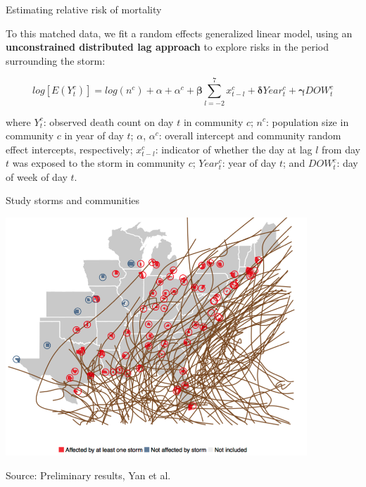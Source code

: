 \documentclass[ignorenonframetext,]{beamer}
\begin{document}
\begin{frame}{Estimating relative risk of mortality}

To this matched data, we fit a random effects generalized linear model,
using an \textbf{unconstrained distributed lag approach} to explore
risks in the period surrounding the storm:

\begin{equation*}
log[E(Y_t^c)]=log(n^c) + \alpha + \alpha^c + 
\boldsymbol{\beta}\sum_{l=-2}^{7} x_{t-l}^c + \boldsymbol{\delta} Year_t^c + 
\boldsymbol{\gamma} DOW_t^c
\end{equation*}

\small

where \(Y_t^c\): observed death count on day \(t\) in community \(c\);
\(n^c\): population size in community \(c\) in year of day \(t\);
\(\alpha\), \(\alpha^c\): overall intercept and community random effect
intercepts, respectively; \(x_{t-l}^c\): indicator of whether the day at
lag \(l\) from day \(t\) was exposed to the storm in community \(c\);
\(Year_t^c\): year of day \(t\); and \(DOW_t^c\): day of week of day
\(t\).

\end{frame}

\begin{frame}{Study storms and communities}

\begin{center}\includegraphics[width=0.85\textwidth]{figures/mortality_storms_counties} \end{center}

\footnotesize Source: Preliminary results, Yan et al.

\end{frame}
\end{document}
